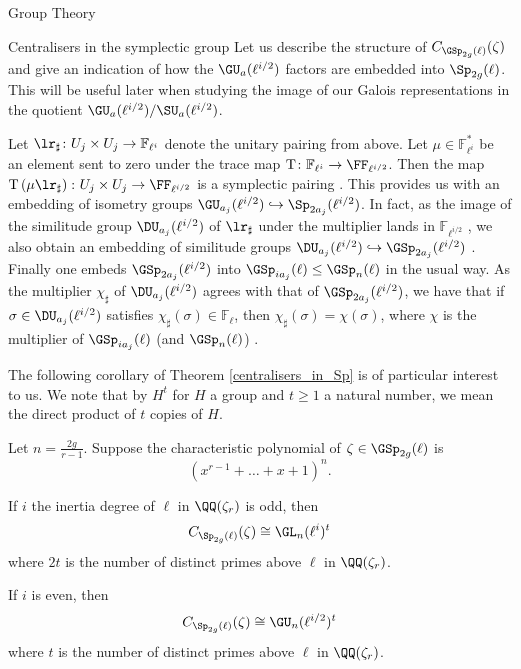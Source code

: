 \documentclass[11pt,a4paper]{article}
\newcommand{\Fl}{\mathbb{F}_\ell}
\newcommand{\Fli}{\mathbb{F}_{\ell^i}}
\newcommand{\Flihalf}{\mathbb{F}_{\ell^{i/2}}}
\newcommand{\lihalf}{{\ell^{i/2}}}
\newcommand{\rcyclo}{\QQ(\zeta_r)}
\begin{document}
\begin{section}{Group Theory}
\begin{subsection}{Centralisers in the symplectic group}
Let us describe the structure of $C_{\GSp_{2g}(\ell)}(\zeta)$ and give an indication of how the $\GU_a(\ell^{i/2})$ factors are embedded into $\Sp_{2g}(\ell)$. This will be useful later when studying the image of our Galois representations in the quotient $\GU_a(\ell^{i/2})/\SU_a(\ell^{i/2})$. 

Let $\lr_{\sharp}\colon U_j \times U_j \rightarrow \Fli$ denote the unitary pairing from above.
Let $\mu \in \Fli^*$ be an element sent to zero under the trace map ${\mathrm T}\colon\Fli \rightarrow \FF_{\ell^{i/2}}$. Then the map ${\mathrm T}\left(\mu \lr_{\sharp}\right)\colon U_j \times U_j \rightarrow \FF_{\ell^{i/2}}$ is a symplectic pairing \cite[Pg.117 - 118]{KleidmanLiebeck}.
This provides us with an embedding of isometry groups $\GU_{a_j}(\ell^{i/2}) \hookrightarrow \Sp_{2a_j}(\ell^{i/2})$.
In fact, as the image of the similitude group $\DU_{a_j}(\ell^{i/2})$ of $\lr_{\sharp}$  under the multiplier lands in $\Flihalf$ \cite[Pg.23]{KleidmanLiebeck}, we also obtain an embedding of similitude groups $\DU_{a_j}(\ell^{i/2}) \hookrightarrow \GSp_{2a_j}(\ell^{i/2})$ \cite[Pg.118]{KleidmanLiebeck}.
Finally one embeds $\GSp_{2a_j}(\lihalf)$ into $\GSp_{ia_j}(\ell) \leq \GSp_{n}(\ell)$ in the usual way. As the multiplier $\chi_\sharp$ of $\DU_{a_j}(\ell^{i/2})$ agrees with that of $ \GSp_{2a_j}(\ell^{i/2})$, we have that if $\sigma \in \DU_{a_j}(\ell^{i/2})$ satisfies $\chi_\sharp(\sigma) \in \Fl$, then $\chi_\sharp(\sigma) =\chi(\sigma)$, where $\chi$ is the multiplier of $\GSp_{ia_j}(\ell)$ (and $\GSp_{n}(\ell)$) \cite[Lemma 4.3.5]{KleidmanLiebeck}.



 
 The following corollary of Theorem \ref{centralisers_in_Sp} is of particular interest to us.
We note that by $H^t$ for $H$ a group and $t \geq 1$ a natural number, we mean the direct product of $t$ copies of $H$.
 
\begin{corollary}
\label{cor_centraliser_structure_of_zr}
Let $n = \frac{2g}{r-1}$. Suppose the characteristic polynomial of $\zeta \in \GSp_{2g}(\ell)$ is $$(x^{r-1} + \ldots + x +
1 )^n.$$

If $i$ the inertia degree of $\ell$ in $\rcyclo$ is odd, then 
$$ C_{\Sp_{2g}(\ell)}(\zeta) \cong \GL_{n}(\ell^i)^{t}$$
where  $2t$ is the number of distinct primes above $\ell$ in $\rcyclo$.

If $i$ is even, then 
$$ C_{\Sp_{2g}(\ell)}(\zeta) \cong \GU_{n}(\ell^{i/2})^t$$
where $t$ is the number of distinct primes above $\ell$ in $\rcyclo$.
\end{corollary}


\end{subsection}
\end{section}
\end{document}
